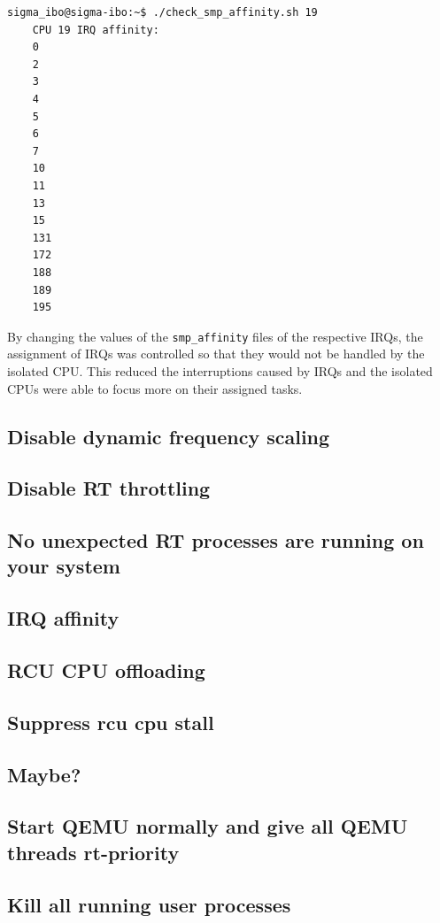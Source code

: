 \documentclass[MMR,Master,english]{twbook}
\begin{document}
\vspace{1em}
\begin{minipage}{0.95\columnwidth}
\begin{lstlisting}[name={Output of smp_affinity for CPU 19},label={output:irq_affinity}, breaklines=true]
	sigma_ibo@sigma-ibo:~$ ./check_smp_affinity.sh 19
	CPU 19 IRQ affinity:
	0
	2
	3
	4
	5
	6
	7
	10
	11
	13
	15
	131
	172
	188
	189
	195
\end{lstlisting}
\end{minipage}

\noindent By changing the values of the \texttt{smp\_affinity} files of the respective IRQs, the assignment of IRQs was controlled so that they would not be handled by the isolated CPU. This reduced the interruptions caused by IRQs and the isolated CPUs were able to focus more on their assigned tasks.
\subsection{Disable dynamic frequency scaling}
\subsection{Disable RT throttling}
\subsection{No unexpected RT processes are running on your system}
\subsection{IRQ affinity}
\subsection{RCU CPU offloading}
\subsection{Suppress rcu cpu stall}
\subsection{Maybe?}
\subsection{Start QEMU normally and give all QEMU threads rt-priority} 
\subsection{Kill all running user processes}
\end{document}
